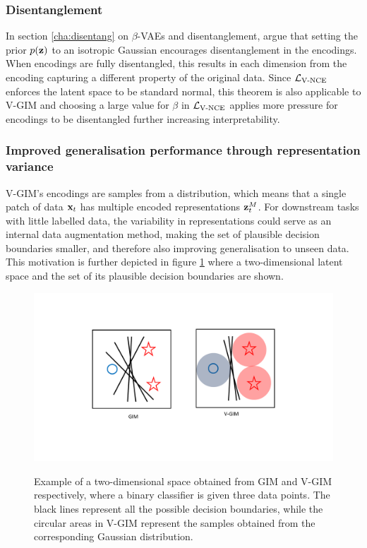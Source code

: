 						
	\subsubsection{Disentanglement}
		In section \ref{cha:disentang} on $\beta$-VAEs and disentanglement, \cite{higginsBetaVAELearningBasic2022} argue that setting the prior $p(\mathbf{z})$ to an isotropic Gaussian encourages disentanglement in the encodings. When encodings are fully disentangled, this results in each dimension from the encoding capturing a different property of the original data. Since $\mathcal{L}_{\text{V-NCE}}$ enforces the latent space to be standard normal, this theorem is also applicable to V-GIM and choosing a large value for $\beta$ in $\mathcal{L}_{\text{V-NCE}}$ applies more pressure for encodings to be disentangled further increasing interpretability.
		
	
	\subsubsection{Improved generalisation performance through representation variance}
		V-GIM's encodings are samples from a distribution, which means that a single patch of data $\mathbf{x}_t$ has multiple encoded representations $\mathbf{z}_t^M$. For downstream tasks with little labelled data, the variability in representations could serve as an internal data augmentation method, making the set of plausible decision boundaries smaller, and therefore also improving generalisation to unseen data. This motivation is further depicted in figure \ref{fig:set_of_decision_boundaries} where a two-dimensional latent space and the set of its plausible decision boundaries are shown.
		
		\begin{figure}
			\centering
			\hspace*{1.5cm}
			\begin{annotatedFigure}
				{\includegraphics[width=0.8\linewidth, trim={5cm 4.5cm 0 4cm}, clip]{"graphs/linear boundary"} }	
			\end{annotatedFigure}
			\caption{Example of a two-dimensional space obtained from GIM and V-GIM respectively, where a binary classifier is given three data points. The black lines represent all the possible decision boundaries, while the circular areas in V-GIM represent the samples obtained from the corresponding Gaussian distribution.}
			\label{fig:set_of_decision_boundaries}
		\end{figure}
		
